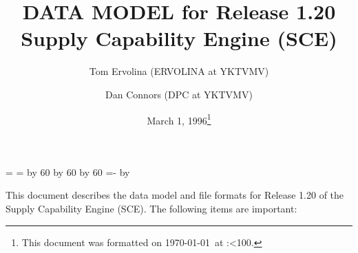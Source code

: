 \topmargin 0.0in
\headheight 0.0in
\headsep 0.0in
\textwidth 7.5in
\oddsidemargin -0.5in
\textheight 9in
\newcount\hh
\newcount\mm

\mm=\time
\hh=\time
\divide\hh by 60
\divide\mm by 60
\multiply\mm by 60
\mm=-\mm
\advance\mm by \time
\def\hhmm{\number\hh:\ifnum\mm<10{}0\fi\number\mm}


\title{DATA MODEL for Release 1.20  Supply Capability Engine (SCE)}
\author{Tom Ervolina (ERVOLINA at YKTVMV) \and Dan Connors  (DPC at YKTVMV)}
\date{March 1, 1996\footnote[2]{This document was 
formatted on \today\ at \hhmm.}}
\maketitle
This document describes the data model and file formats 
for Release 1.20 of the Supply Capability 
Engine (SCE).  The following items are important:
